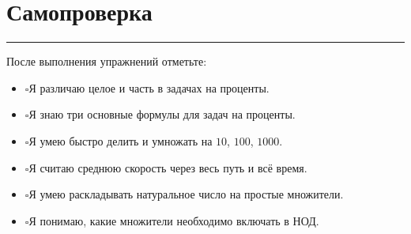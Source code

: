 \documentclass[a4paper,12pt]{article}
\newcommand{\sectionline}{%
    \vspace{0.2em}
    {\color{accent}\rule{\linewidth}{0.6pt}}
    \vspace{0.5em}
}
\newcommand{\checkitem}{\(\square\)\;}
\begin{document}
\vspace{12mm}

\section*{\color{darkaccent}Самопроверка}
\sectionline

После выполнения упражнений отметьте:

\begin{itemize}[leftmargin=7mm,itemsep=5pt]
    \item \checkitem Я различаю целое и часть в задачах на проценты.
    \item \checkitem Я знаю три основные формулы для задач на проценты.
    \item \checkitem Я умею быстро делить и умножать на \(10\), \(100\), \(1000\).
    \item \checkitem Я считаю среднюю скорость через весь путь и всё время.
    \item \checkitem Я умею раскладывать натуральное число на простые множители.
    \item \checkitem Я понимаю, какие множители необходимо включать в НОД.
\end{itemize}

\vfill
\end{document}
